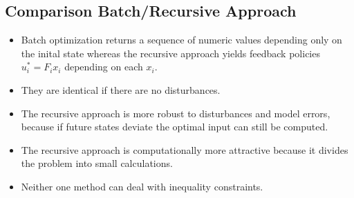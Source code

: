\documentclass[8pt,a4paper]{scrartcl}
\begin{document}
\begin{multicols*}{3}
\begin{multicols*}{4}

\tiny{}


\normalsize

\longversion{}%
\subsection{Comparison Batch/Recursive Approach}

\begin{itemize}

\item Batch optimization returns a sequence of numeric values depending only on the inital state whereas the recursive approach yields feedback policies $u_i^\ast=F_ix_i$ depending on each $x_i$.
\item They are identical if there are no disturbances.
\item The recursive approach is more robust to disturbances and model errors, because if future states deviate the optimal input can still be computed.
\item The recursive approach is computationally more attractive because it divides the problem into small calculations.
\item Neither one method can deal with inequality constraints.
\end{itemize}

\longversion{
}
\end{multicols*}
\end{multicols*}
\end{document}
